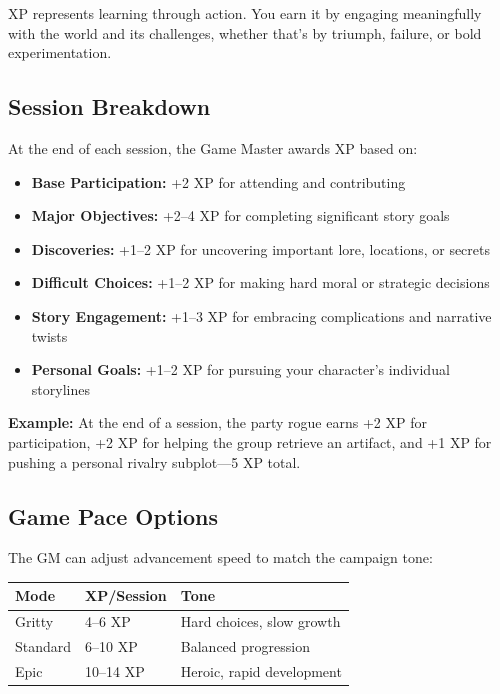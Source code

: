 \documentclass[11pt,twoside,openany]{book}
\begin{document}
XP represents learning through action. You earn it by engaging meaningfully with the world and its challenges, whether that's by triumph, failure, or bold experimentation.

\subsection*{Session Breakdown}

At the end of each session, the Game Master awards XP based on:
\begin{itemize}
\item \textbf{Base Participation:} +2 XP for attending and contributing
\item \textbf{Major Objectives:} +2--4 XP for completing significant story goals
\item \textbf{Discoveries:} +1--2 XP for uncovering important lore, locations, or secrets
\item \textbf{Difficult Choices:} +1--2 XP for making hard moral or strategic decisions
\item \textbf{Story Engagement:} +1--3 XP for embracing complications and narrative twists
\item \textbf{Personal Goals:} +1--2 XP for pursuing your character's individual storylines
\end{itemize}

\textbf{Example:} At the end of a session, the party rogue earns +2 XP for participation, +2 XP for helping the group retrieve an artifact, and +1 XP for pushing a personal rivalry subplot---5 XP total.

\subsection*{Game Pace Options}

The GM can adjust advancement speed to match the campaign tone:

\begin{center}
\begin{tabular}{|l|l|l|}
\hline
\textbf{Mode} & \textbf{XP/Session} & \textbf{Tone} \\
\hline
Gritty & 4--6 XP & Hard choices, slow growth \\
Standard & 6--10 XP & Balanced progression \\
Epic & 10--14 XP & Heroic, rapid development \\
\hline
\end{tabular}
\end{center}
\end{document}
